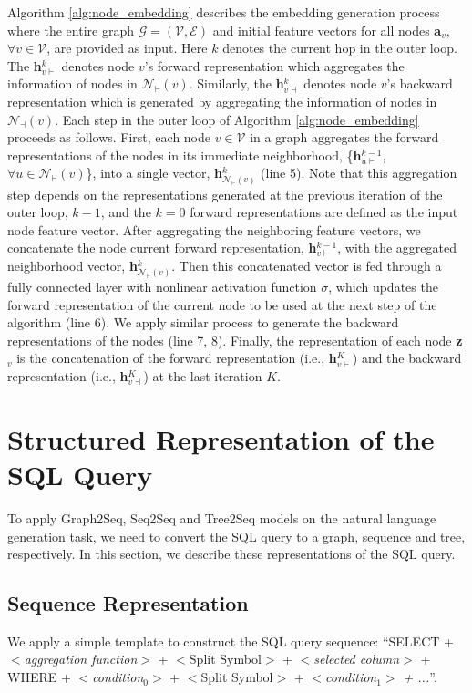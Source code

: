 \documentclass{article} \usepackage{iclr2019_conference,times}
\begin{document}
Algorithm \ref{alg:node_embedding} describes the embedding generation process where the entire graph $\mathcal{G} = (\mathcal{V}, \mathcal{E})$
and initial feature vectors for all nodes \textbf{a}$_{v}$, $\forall v \in \mathcal{V}$, are provided as input.
Here $k$ denotes the current hop in the outer loop. The \textbf{h}$_{v\vdash}^{k}$ denotes node $v$'s forward representation
which aggregates the information of nodes in $\mathcal{N}_{\vdash}(v)$.
Similarly, the \textbf{h}$_{v\dashv}^{k}$ denotes node $v$'s backward representation which is generated by
aggregating the information of nodes in $\mathcal{N}_{\dashv}(v)$.
Each step in the outer loop of Algorithm \ref{alg:node_embedding} proceeds as follows.
First, each node $v\in \mathcal{V}$ in a graph aggregates the forward representations of the nodes in its immediate neighborhood,
\{\textbf{h}$_{u\vdash}^{k-1}$, $\forall u \in \mathcal{N}_{\vdash}(v)$\}, into a single vector, \textbf{h}$_{\mathcal{N}_{\vdash}(v)}^{k}$ (line 5).
Note that this aggregation step depends on the representations generated at the previous iteration of the
outer loop, $k-1$, and the $k=0$ forward representations are defined as the input node feature vector.
After aggregating the neighboring feature vectors, we concatenate the node current forward representation, \textbf{h}$_{v\vdash}^{k-1}$, with the aggregated neighborhood vector, \textbf{h}$_{\mathcal{N}_{\vdash}(v)}^{k}$. Then this concatenated vector is fed through a fully connected layer with nonlinear activation function $\sigma$,
which updates the forward representation of the current node to be used at the next step of the algorithm (line 6).
We apply similar process to generate the backward representations of the nodes (line 7, 8).
Finally, the representation of each node \textbf{z}$_{v}$ is the concatenation of the forward
representation (i.e., \textbf{h}$_{v\vdash}^{K}$) and the backward representation (i.e., \textbf{h}$_{v\dashv}^{K}$) at the last iteration $K$.

\section{Structured Representation of the SQL Query}
To apply Graph2Seq, Seq2Seq and Tree2Seq models on the natural language generation task, we need to convert the SQL query to a graph, sequence and tree, respectively.
In this section, we describe these representations of the SQL query.

\subsection{Sequence Representation}
We apply a simple template to construct the SQL query sequence: ``SELECT + \textit{$<$aggregation function$>$} + $<$Split Symbol$>$ + \textit{$<$selected column$>$} + WHERE + \textit{$<$condition$_{0}$$>$} + $<$Split Symbol$>$ + \textit{$<$condition$_{1}$$>$ + ...}''.
\end{document}
